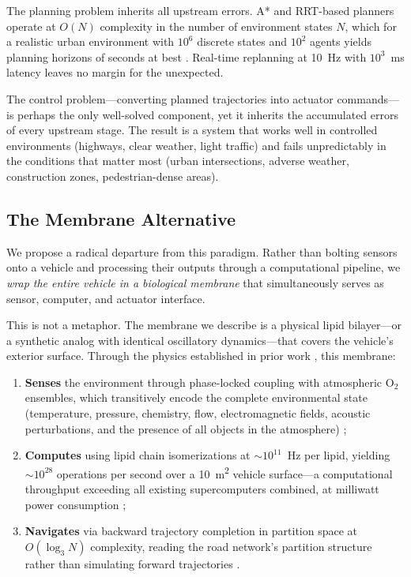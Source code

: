 \documentclass[12pt]{article}
\theoremstyle{definition}
\theoremstyle{remark}
\begin{document}
The planning problem inherits all upstream errors. A* and RRT-based planners operate at $O(N)$ complexity in the number of environment states $N$, which for a realistic urban environment with $10^6$ discrete states and $10^2$ agents yields planning horizons of seconds at best \cite{urmson2008autonomous}. Real-time replanning at \SI{10}{Hz} with $10^3$~ms latency leaves no margin for the unexpected.

The control problem---converting planned trajectories into actuator commands---is perhaps the only well-solved component, yet it inherits the accumulated errors of every upstream stage. The result is a system that works well in controlled environments (highways, clear weather, light traffic) and fails unpredictably in the conditions that matter most (urban intersections, adverse weather, construction zones, pedestrian-dense areas).

\subsection{The Membrane Alternative}

We propose a radical departure from this paradigm. Rather than bolting sensors onto a vehicle and processing their outputs through a computational pipeline, we \emph{wrap the entire vehicle in a biological membrane} that simultaneously serves as sensor, computer, and actuator interface.

This is not a metaphor. The membrane we describe is a physical lipid bilayer---or a synthetic analog with identical oscillatory dynamics---that covers the vehicle's exterior surface. Through the physics established in prior work \cite{sachikonye2025membrane, sachikonye2026lipid, sachikonye2025cpu, sachikonye2025circuits}, this membrane:

\begin{enumerate}[label=(\roman*)]
  \item \textbf{Senses} the environment through phase-locked coupling with atmospheric $\mathrm{O}_2$ ensembles, which transitively encode the complete environmental state (temperature, pressure, chemistry, flow, electromagnetic fields, acoustic perturbations, and the presence of all objects in the atmosphere) \cite{sachikonye2026atmospheric, sachikonye2026gas};
  \item \textbf{Computes} using lipid chain isomerizations at $\sim 10^{11}$~Hz per lipid, yielding $\sim 10^{28}$ operations per second over a \SI{10}{m^2} vehicle surface---a computational throughput exceeding all existing supercomputers combined, at milliwatt power consumption \cite{sachikonye2025cpu, sachikonye2025circuits};
  \item \textbf{Navigates} via backward trajectory completion in partition space at $O(\log_3 N)$ complexity, reading the road network's partition structure rather than simulating forward trajectories \cite{sachikonye2026backward, sachikonye2026trajectory}.
\end{enumerate}
\end{document}
